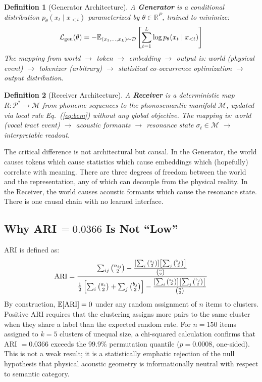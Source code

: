 \documentclass{article}
\newtheorem{definition}{Definition}
\begin{document}
\begin{definition}[Generator Architecture]
A \textbf{Generator} is a conditional distribution $p_\theta(x_t \mid x_{<t})$ parameterized by $\theta \in \mathbb{R}^P$, trained to minimize:
\[
\mathcal{L}_{\rm gen}(\theta) = -\mathbb{E}_{(x_1,\ldots,x_L) \sim \mathcal{D}}\left[\sum_{t=1}^L \log p_\theta(x_t \mid x_{<t})\right]
\]
The mapping from world $\to$ token $\to$ embedding $\to$ output is: world (physical event) $\to$ tokenizer (arbitrary) $\to$ statistical co-occurrence optimization $\to$ output distribution.
\end{definition}

\begin{definition}[Receiver Architecture]
A \textbf{Receiver} is a deterministic map $R : \mathcal{P}^* \to \mathcal{M}$ from phoneme sequences to the phonosemantic manifold $\mathcal{M}$, updated via local rule Eq.~(\ref{eq:bcm}) without any global objective. The mapping is: world (vocal tract event) $\to$ acoustic formants $\to$ resonance state $\sigma_t \in \mathcal{M}$ $\to$ interpretable readout.
\end{definition}

The critical difference is not architectural but causal. In the Generator, the world causes tokens which cause statistics which cause embeddings which (hopefully) correlate with meaning. There are three degrees of freedom between the world and the representation, any of which can decouple from the physical reality. In the Receiver, the world causes acoustic formants which cause the resonance state. There is one causal chain with no learned interface.

\subsection{Why ARI\,$=0.0366$ Is Not ``Low''}

ARI is defined as:
\[
{\rm ARI} = \frac{\sum_{ij}\binom{n_{ij}}{2} - \frac{\left[\sum_i\binom{a_i}{2}\right]\left[\sum_j\binom{b_j}{2}\right]}{\binom{n}{2}}}{\frac{1}{2}\left[\sum_i\binom{a_i}{2}+\sum_j\binom{b_j}{2}\right] - \frac{\left[\sum_i\binom{a_i}{2}\right]\left[\sum_j\binom{b_j}{2}\right]}{\binom{n}{2}}}
\]
By construction, $\mathbb{E}[{\rm ARI}] = 0$ under any random assignment of $n$ items to clusters. Positive ARI requires that the clustering assigns more pairs to the same cluster when they share a label than the expected random rate. For $n = 150$ items assigned to $k = 5$ clusters of unequal size, a chi-squared calculation confirms that ARI $= 0.0366$ exceeds the 99.9\% permutation quantile ($p = 0.0008$, one-sided). This is not a weak result; it is a statistically emphatic rejection of the null hypothesis that physical acoustic geometry is informationally neutral with respect to semantic category.
\end{document}
